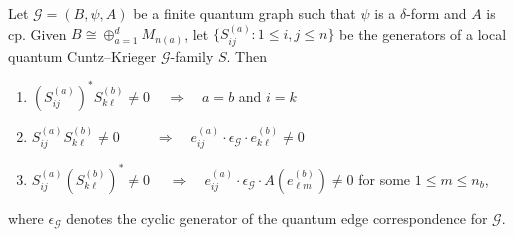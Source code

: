 \documentclass[11pt]{article}
\theoremstyle{plain}
\theoremstyle{nonumberplain}
\theoremstyle{plain}
\theoremstyle{nonumberplain}
\newcommand\1{{\bf 1}}
\newcommand\cG{{\mathcal G}}
\newcommand\cO{{\mathcal O}}
\newcommand{\<}{\left\langle}
\renewcommand{\>}{\right\rangle}
\begin{document}
    Let $\cG=(B,\psi,A)$ be a finite quantum graph such that $\psi$ is a $\delta$-form and $A$ is cp. Given $B\cong \oplus_{a=1}^d M_{n(a)}$, let $\{S^{(a)}_{ij}:1\leq i,j\leq n\}$ be the generators of a local quantum Cuntz--Krieger $\cG$-family $S$. Then 
\begin{enumerate}
    \item $(S_{ij}^{(a)})^* S_{k\ell}^{(b)} \neq 0 
    \quad \, \Longrightarrow \quad 
    a=b$ and $i=k$
    \item $S_{ij}^{(a)}S_{k\ell}^{(b)}\neq 0
    \quad \quad \,\,\,\Longrightarrow \quad
    e_{ij}^{(a)}\cdot \epsilon_{\cG} \cdot e_{k\ell}^{(b)}\neq 0$
    \item $S_{ij}^{(a)}(S_{k\ell}^{(b)})^*\neq 0 
    \quad \,\, \Longrightarrow \quad e_{ij}^{(a)}\cdot \epsilon_\cG\cdot A(e_{\ell m}^{(b)})\neq 0$ for some $1\leq m\leq n_b$,
    \end{enumerate}
where $\epsilon_\cG$ denotes the cyclic generator of the quantum edge correspondence for $\cG$.
\end{document}
